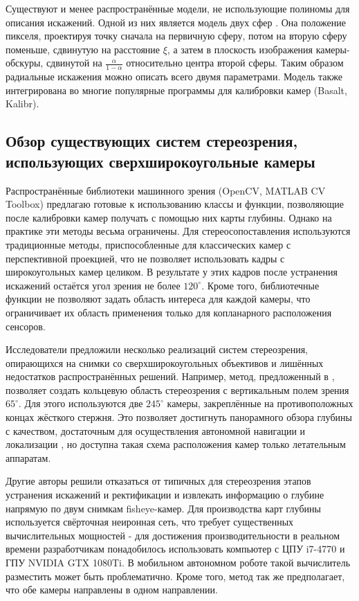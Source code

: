 Существуют и менее распространённые модели, не использующие полиномы для описания искажений. Одной из них является
модель двух сфер \cite{double_sphere}. %
Она положение пикселя, проектируя точку сначала на первичную сферу, потом на вторую сферу поменьше, сдвинутую на 
расстояние $\xi$, а затем в плоскость изображения камеры-обскуры, сдвинутой на $\frac{\alpha}{1-\alpha}$ относительно 
центра второй сферы. Таким образом радиальные искажения можно описать всего двумя параметрами. Модель также интегрирована
во многие популярные программы для калибровки камер (Basalt, Kalibr).


\subsection{Обзор существующих систем стереозрения, использующих сверхширокоугольные камеры}

Распространённые библиотеки машинного зрения (OpenCV, MATLAB CV Toolbox) предлагаю готовые к использованию классы и функции, позволяющие после калибровки
камер получать с помощью них карты глубины. Однако на практике эти методы весьма ограничены. Для стереосопоставления 
используются традиционные методы, приспособленные для классических камер с перспективной проекцией, что не позволяет 
использовать кадры с широкоугольных камер целиком. В результате у этих кадров после устранения искажений остаётся 
угол зрения не более $120^\circ$. Кроме того, библиотечные функции не позволяют задать область интереса для каждой камеры, 
что ограничивает их область применения только для копланарного расположения сенсоров.   

Исследователи предложили несколько реализаций систем стереозрения, опирающихся на снимки со сверхширокоугольных 
объективов и лишённых недостатков распространённых решений.  
Например, метод, предложенный в \cite{omni_stereo}, позволяет создать кольцевую область стереозрения с вертикальным  %
полем зрения $65^\circ$. Для этого используются две $245^\circ$ камеры, закреплённые на противоположных концах жёсткого стержня.  
Это позволяет достигнуть панорамного обзора глубины с качеством, достаточным для осуществления автономной навигации и
локализации \cite{omni_copter}, но доступна такая схема расположения камер только летательным аппаратам.  

Другие авторы \cite{direct_neuro_stereo} решили отказаться от типичных для стереозрения этапов устранения искажений и ректификации %
и извлекать информацию о глубине напрямую по двум снимкам fisheye-камер. Для производства карт глубины используется 
свёрточная неиронная сеть, что требует существенных вычислительных мощностей - для достижения производительности в реальном 
времени разработчикам понадобилось использовать компьютер с ЦПУ i7-4770 и ГПУ NVIDIA GTX 1080Ti. В мобильном автономном роботе
такой вычислитель разместить может быть проблематично. Кроме того, метод так же предполагает, что обе камеры направлены в одном 
направлении. 


 